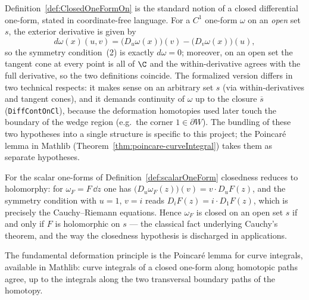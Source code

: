 \begin{remark}\label{rem:closed-one-form-comparison}
  Definition~\ref{def:ClosedOneFormOn} is the standard notion of a closed differential one-form,
  stated in coordinate-free language. For a $C^1$ one-form $\omega$ on an \emph{open} set
  $s$, the exterior derivative is given by
  \[
    d\omega(x)(u, v) = \bigl(D_u \omega(x)\bigr)(v) - \bigl(D_v \omega(x)\bigr)(u),
  \]
  so the symmetry condition~(2) is exactly $d\omega = 0$; moreover, on an open set the tangent
  cone at every point is all of $\C$ and the within-derivative agrees with the full derivative, so
  the two definitions coincide. The formalized version differs in two technical respects: it makes
  sense on an arbitrary set $s$ (via within-derivatives and tangent cones), and it demands
  continuity of $\omega$ up to the closure $\overline{s}$ (\texttt{DiffContOnCl}), because the
  deformation homotopies used later touch the boundary of the wedge region (e.g.\ the corner
  $1 \in \partial W$). The bundling of these two hypotheses into a single structure is specific to
  this project; the Poincar\'e lemma in Mathlib
  (Theorem~\ref{thm:poincare-curveIntegral}) takes them as separate hypotheses.

  For the scalar one-forms of Definition~\ref{def:scalarOneForm} closedness reduces to
  holomorphy: for $\omega_F = F \, \dd z$ one has
  $\bigl(D_u \omega_F(z)\bigr)(v) = v \cdot D_u F(z)$, and the symmetry condition with $u = 1$,
  $v = i$ reads $D_i F(z) = i \cdot D_1 F(z)$, which is precisely the Cauchy--Riemann equations.
  Hence $\omega_F$ is closed on an open set $s$ if and only if $F$ is holomorphic on $s$ --- the
  classical fact underlying Cauchy's theorem, and the way the closedness hypothesis is discharged
  in applications.
\end{remark}

The fundamental deformation principle is the Poincar\'e lemma for curve integrals, available in
Mathlib: curve integrals of a closed one-form along homotopic paths agree, up to the integrals
along the two transversal boundary paths of the homotopy.

